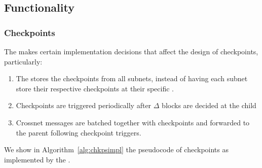 \subsection{Functionality}

\subsubsection{Checkpoints} 
The \impl makes certain implementation decisions that affect the design of checkpoints, particularly:
\begin{enumerate}
\item The \gw stores the checkpoints from all subnets, instead of having each subnet store their respective checkpoints at their specific \sa.
\item Checkpoints are triggered periodically after $\Delta$ blocks are decided at the child
\item Crossnet messages are batched together with checkpoints and forwarded to the parent following checkpoint triggers.
\end{enumerate}

We show in Algorithm~\ref{alg:chkpsimpl} the pseudocode of checkpoints as implemented by the \impl.

